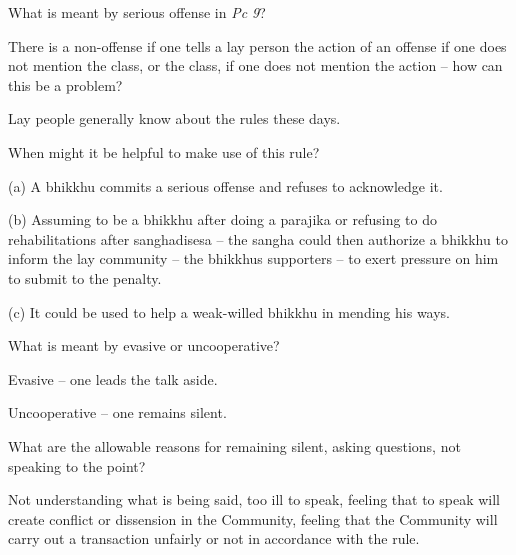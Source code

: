 \bigskip


What is meant by serious offense in \emph{Pc 9}?

\bigskip

There is a non-offense if one tells a lay person the action of an offense if
one does not mention the class, or the class, if one does not mention the action
– how can this be a problem?

\bigskip

\begin{solution}
  Lay people generally know about the rules these days.
\end{solution}

When might it be helpful to make use of this rule?

\bigskip

\begin{solution}
  (a) A bhikkhu commits a serious offense and refuses to acknowledge it.
 
  (b) Assuming to be a bhikkhu after doing a parajika or refusing to do
  rehabilitations after sanghadisesa – the sangha could then authorize a bhikkhu
  to inform the lay community – the bhikkhus supporters – to exert pressure on
  him to submit to the penalty.
 
  (c) It could be used to help a weak-willed bhikkhu in mending his ways.
\end{solution}


What is meant by evasive or uncooperative? 

\begin{solution}
  Evasive – one leads the talk aside.
  
  Uncooperative – one remains silent.
\end{solution}

\bigskip

What are the allowable reasons for remaining silent, asking questions, not speaking to the point?

\begin{solution}
  Not understanding what is being said, too ill to speak, feeling that to speak
  will create conflict or dissension in the Community, feeling that the Community
  will carry out a transaction unfairly or not in accordance with the rule.
\end{solution}

